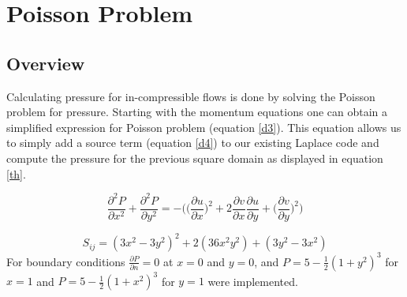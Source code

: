 \documentclass[paper=a4, fontsize=11pt, abstract=on]{scrartcl}
\numberwithin{equation}{section}		%
\numberwithin{figure}{section}			%
\numberwithin{table}{section}				%
\begin{document}
 




\section{Poisson Problem}
\subsection{Overview}
Calculating pressure for in-compressible flows is done by solving the Poisson problem for pressure. Starting with the momentum equations one can obtain a simplified expression for Poisson problem (equation \ref{d3}). This equation allows us to simply add a source term (equation \ref{d4}) to our existing Laplace code and compute the pressure for the previous square domain as displayed in equation \ref{th}.


\begin{equation}
\label{d3}
\frac{\partial^2P}{\partial x^2} + \frac{\partial^2P}{\partial y^2} = -\Bigg(\Bigg(\frac{\partial u}{\partial x}\Bigg)^2 +2\frac{\partial v}{\partial x}\frac{\partial u}{\partial y}        +\Bigg(\frac{\partial v}{\partial y}\Bigg)^2\Bigg)
\end{equation}

\begin{equation}
\label{d4}
S_{ij} = (3x^2-3y^2)^2+2(36x^2y^2)+(3y^2-3x^2)
\end{equation}
For boundary conditions $\frac{\partial P}{\partial n}=0$ at $x=0$ and $y=0$, and $P=5-\frac{1}{2}(1+y^2)^3$ for $x=1$ and $P=5-\frac{1}{2}(1+x^2)^3$ for $y=1$ were implemented. 
\end{document}
